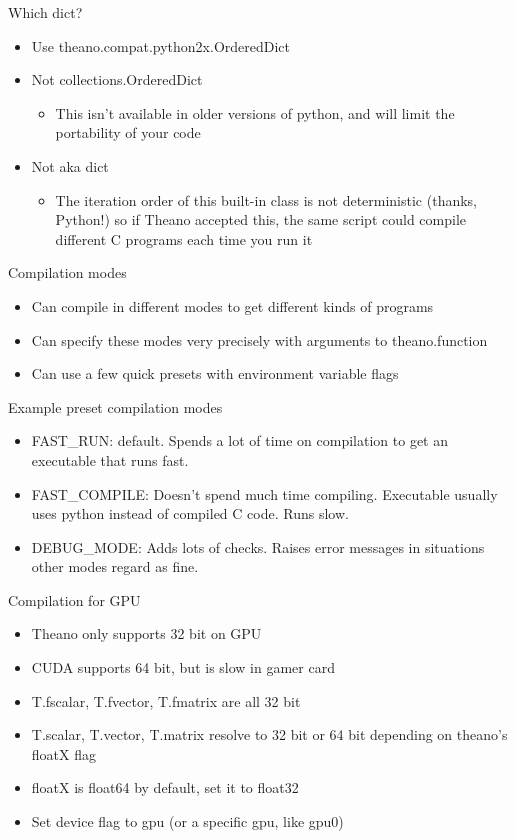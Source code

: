 \documentclass[utf8x,xcolor=pdftex,dvipsnames,table]{beamer}
\begin{document}
\begin{frame}{Which dict?}
  \begin{itemize}
  \item Use theano.compat.python2x.OrderedDict
  \item Not collections.OrderedDict
  \begin{itemize}
  \item This isn’t available in older versions of python,
and will limit the portability of your code
  \end{itemize}
  \item Not {} aka dict
  \begin{itemize}
  \item The iteration order of this built-in class is not
    deterministic (thanks, Python!) so if Theano
    accepted this, the same script could compile
    different C programs each time you run it
  \end{itemize}
  \end{itemize}
\end{frame}

\begin{frame}{Compilation modes}  
  \begin{itemize}
  \item Can compile in different modes to get different kinds of programs
  \item Can specify these modes very precisely with arguments to theano.function
  \item Can use a few quick presets with environment variable flags
  \end{itemize}
\end{frame}

\begin{frame}{Example preset compilation modes}
  \begin{itemize}
  \item FAST\_RUN: default. Spends a lot of time on
compilation to get an executable that runs
fast.
  \item FAST\_COMPILE: Doesn’t spend much time
compiling. Executable usually uses python
instead of compiled C code. Runs slow.
  \item DEBUG\_MODE: Adds lots of checks.
Raises error messages in situations other
modes regard as fine.
  \end{itemize}
\end{frame}

\begin{frame}{Compilation for GPU}
  \begin{itemize}
  \item Theano only supports 32 bit on GPU
  \item CUDA supports 64 bit, but is slow in gamer card
  \item T.fscalar, T.fvector, T.fmatrix are all 32 bit
  \item T.scalar, T.vector, T.matrix resolve to 32 bit or 64 bit depending on theano’s floatX flag
  \item floatX is float64 by default, set it to float32
  \item Set device flag to gpu (or a specific gpu, like gpu0)
  \end{itemize}
\end{frame}
\end{document}
